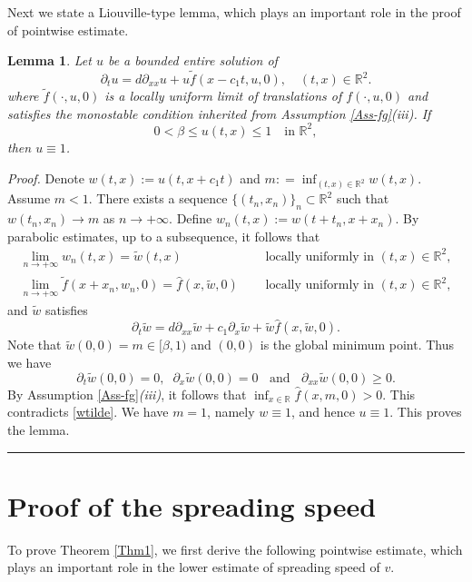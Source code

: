 \documentclass[10pt]{article}
\numberwithin{equation}{section}
\newcommand{\R}{\mathbb{R}}
\newtheorem{lemma}[theorem]{Lemma}
\newenvironment{proof}[1][Proof]{\noindent\textit{#1.} }{\hfill \rule{0.5em}{0.5em}}
\begin{document}
Next we  state a Liouville-type lemma, which   plays an  important role in the  proof of pointwise estimate. 
\begin{lemma}\label{Lem-liou}
Let $u$  be a bounded entire solution of
 \begin{equation*}
  \partial_t u= d \partial_{xx} u +  u \tilde{f}(x-c_1 t, u, 0), \quad  (t,x) \in \R^2.
 \end{equation*} 
where   $\tilde f(\cdot, u, 0)$  is a locally uniform limit of translations of  $f(\cdot, u, 0)$
and satisfies the monostable condition inherited from Assumption \ref{Ass-fg}\textit{(iii)}. 
If
\[
0<\beta\leq u(t,x)\leq 1 \quad \text{in } \mathbb R^2,
\]
then $u \equiv 1$.
\end{lemma}
\begin{proof}
Denote  $w(t,x) := u(t, x+c_1 t)$ and  $m: = \inf_{(t,x) \in \R^2}w(t,x)$.  Assume  $m<1$.  There exists a sequence $\{ (t_n,x_n) \}_n \subset  \R^2$ such that  $w(t_n, x_n) \to m$ as $n \to +\infty$.   Define $w_n (t,x) := w(t+t_n, x+x_n)$.  By parabolic estimates, up to a subsequence,  it follows that  
\begin{equation*}
\begin{split}
\lim_{n\to +\infty}  w_n (t,x) = \tilde{w} (t,x)   \quad  &\text{ locally uniformly in } (t,x) \in \R^2, \\
 \lim_{n\to +\infty} \tilde{f}(x+x_n, w_n, 0) = \hat{f} (x, \tilde{w}, 0)   \quad  &\text{ locally uniformly in } (t,x) \in \R^2,
\end{split}
\end{equation*}
and  $\tilde{w}$ satisfies 
\begin{equation}\label{wtilde}
\partial_{t} \tilde{w} = d \partial_{xx} \tilde{w} +  c_1 \partial_x \tilde{w} + \tilde{w} \hat{f} (x, \tilde{w}, 0). 
\end{equation}
Note that   $\tilde{w}(0,0) = m  \in [\beta, 1)$ and $(0, 0) $ is the global minimum point.
Thus we have  
$$\partial_{t} \tilde{w}(0,0) =0, \;\;  \partial_{x} \tilde{w}(0,0) =0  \;\; \text{ and }  \;\;   \partial_{xx} \tilde{w}(0,0) \geq 0.  $$
By Assumption \ref{Ass-fg}\textit{(iii)}, it follows   that  $\inf_{x\in\R} \hat{f} (x, m, 0)>0$.  This contradicts  \eqref{wtilde}. We have  $m= 1$, namely $w\equiv 1$, and hence $u\equiv 1$. This proves the lemma.
 
\end{proof}

\section{Proof of the spreading speed}
To prove Theorem \ref{Thm1},  we first derive the  following  pointwise estimate, which  plays an important role in the lower estimate of spreading speed of $v$.  
\end{document}
